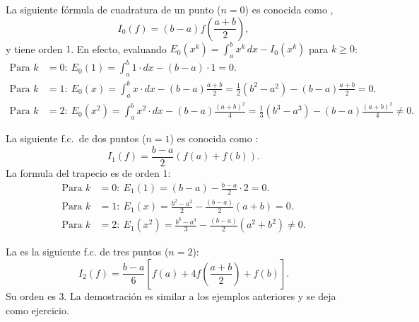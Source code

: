 \begin{example}
  \label{ex:formula-punto-medio}
  La siguiente fórmula de cuadratura de un punto ($n=0$) es conocida
  como ,
  \begin{equation}
    \label{eq:f.c.-pto-medio}
    I_0(f)= (b-a) f\left(\frac{a+b}{2}\right),
  \end{equation}
  y tiene orden $1$. En efecto, evaluando $E_0(x^k)=\int_a^b
  x^k\, dx-I_0(x^k)$ para $k\ge 0$:
  \begin{align*}
   \text{Para } k&=0:\ E_0(1) = \int_a^b 1\cdot dx - (b-a)\cdot 1 = 0.
   \\
   \text{Para } k&=1:\ E_0(x) = \int_a^b x\cdot dx - (b-a)\frac{a+b}{2}
   = \frac{1}{2}(b^2-a^2) -  (b-a) \frac{a+b}{2} = 0.
   \\
   \text{Para } k&=2:\ E_0(x^2) = \int_a^b x^2\cdot dx
   - (b-a) \frac{(a+b)^2}{4}
   = \frac{1}{3}(b^3-a^3) - (b-a)\frac{(a+b)^2}{4}
   \neq 0.
  \end{align*}
\end{example}

\begin{example}
  \label{ex:formula-trapecio}
  La siguiente f.c.\ de dos puntos ($n=1$) es conocida
  como :
  \begin{equation*}
    I_1(f)= \frac{b-a}{2}\left(f(a)+f(b)\right).
  \end{equation*}
  La formula del trapecio es de orden 1:
  \begin{align*}
    \text{Para } k&=0:\ E_1(1) = (b-a) - \frac{b-a}2\cdot 2 = 0.
    \\
    \text{Para } k&=1:\ E_1(x) = \frac{b^2-a^2}{2} -
    \frac{(b-a)}{2}(a+b) = 0.
    \\
    \text{Para } k&=2:\ E_1(x^2) = \frac{b^3-a^3}{3} -
    \frac{(b-a)}{2}(a^2+b^2) \neq 0.
  \end{align*}
\end{example}

\begin{example}
  \label{ex:formula-simpson}
  La  es la siguiente f.c.
  de tres puntos ($n=2$):
  \begin{equation}
    I_2(f)= \frac{b-a}{6}\left[f(a)+4f
      \left(\frac{a+b}{2}\right)+f(b)\right].
    \label{eq:formula-simpson}
  \end{equation}
  Su orden es $3$. La demostración es similar a los ejemplos anteriores y se deja como ejercicio.
\end{example}

